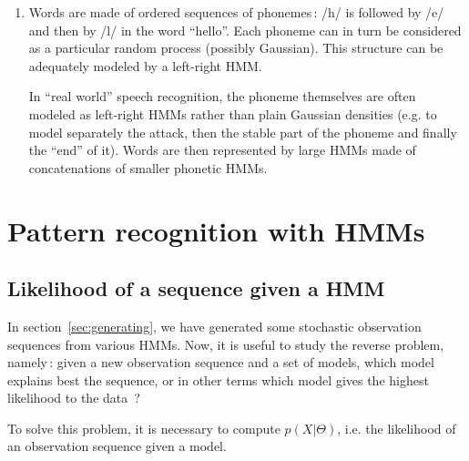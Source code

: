 \documentclass[twoside,a4paper,titlepage]{article}
\newcommand{\tab}{\hspace{1em}}
\begin{document}
{\begin{enumerate}
In the case of an ergodic HMM with $N$ emitting states and Gaussian
emission probabilities, we have\,: 
\begin{itemize}
\item $(N-2) \times (N-2)$ transitions, plus $(N-2)$ initial state
probabilities and $(N-2)$ probabilities to go to the final state;
\item $(N-2)$ emitting states where each pdf is characterized by a $D$
dimensional mean and a $D \times D$ covariance matrix.
\end{itemize}
Hence, in this case, the total number of parameters is $(N-2) \times \left(
N + D \times (D+1) \right)$. Note that this number grows exponentially with
the number of states and the dimension of the data.

\item Words are made of ordered sequences of phonemes\,: /h/ is followed by
/e/ and then by /l/ in the word ``hello''. Each phoneme can in turn be
considered as a particular random process (possibly Gaussian). This
structure can be adequately modeled by a left-right HMM.

\tab In ``real world'' speech recognition, the phoneme themselves are often
modeled as left-right HMMs rather than plain Gaussian densities (e.g. to
model separately the attack, then the stable part of the phoneme and
finally the ``end'' of it). Words are then represented by large HMMs made
of concatenations of smaller phonetic HMMs.

\end{enumerate}
}

\vfill

\pagebreak
\section{Pattern recognition with HMMs}

\subsection{Likelihood of a sequence given a HMM}
In section~\ref{sec:generating}, we have generated some stochastic
observation sequences from various HMMs. Now, it is useful to study the
reverse problem, namely\,: given a new observation sequence and a set of
models, which model explains best the sequence, or in other terms which
model gives the highest likelihood to the data~?

To solve this problem, it is necessary to compute $p(X|\Theta)$, i.e. the
likelihood of an observation sequence given a model.
\end{document}

